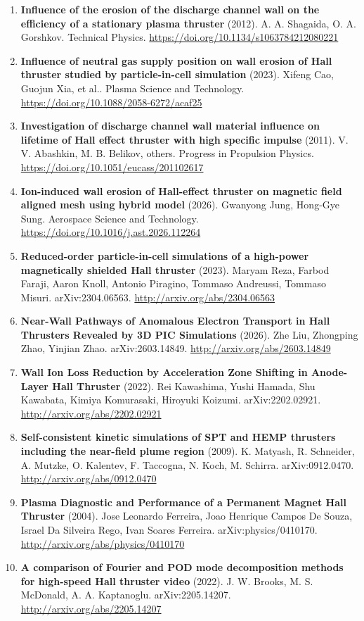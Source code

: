 \documentclass[11pt,a4paper]{article}
\begin{document}
\begin{enumerate}[leftmargin=1.4em]
\item \textbf{Influence of the erosion of the discharge channel wall on the efficiency of a stationary plasma thruster} (2012). A. A. Shagaida, O. A. Gorshkov. Technical Physics. \url{https://doi.org/10.1134/s1063784212080221}
\item \textbf{Influence of neutral gas supply position on wall erosion of Hall thruster studied by particle-in-cell simulation} (2023). Xifeng Cao, Guojun Xia, et al.. Plasma Science and Technology. \url{https://doi.org/10.1088/2058-6272/acaf25}
\item \textbf{Investigation of discharge channel wall material influence on lifetime of Hall effect thruster with high specific impulse} (2011). V. V. Abashkin, M. B. Belikov, others. Progress in Propulsion Physics. \url{https://doi.org/10.1051/eucass/201102617}
\item \textbf{Ion-induced wall erosion of Hall-effect thruster on magnetic field aligned mesh using hybrid model} (2026). Gwanyong Jung, Hong-Gye Sung. Aerospace Science and Technology. \url{https://doi.org/10.1016/j.ast.2026.112264}
\item \textbf{Reduced-order particle-in-cell simulations of a high-power magnetically shielded Hall thruster} (2023). Maryam Reza, Farbod Faraji, Aaron Knoll, Antonio Piragino, Tommaso Andreussi, Tommaso Misuri. arXiv:2304.06563. \url{http://arxiv.org/abs/2304.06563}
\item \textbf{Near-Wall Pathways of Anomalous Electron Transport in Hall Thrusters Revealed by 3D PIC Simulations} (2026). Zhe Liu, Zhongping Zhao, Yinjian Zhao. arXiv:2603.14849. \url{http://arxiv.org/abs/2603.14849}
\item \textbf{Wall Ion Loss Reduction by Acceleration Zone Shifting in Anode-Layer Hall Thruster} (2022). Rei Kawashima, Yushi Hamada, Shu Kawabata, Kimiya Komurasaki, Hiroyuki Koizumi. arXiv:2202.02921. \url{http://arxiv.org/abs/2202.02921}
\item \textbf{Self-consistent kinetic simulations of SPT and HEMP thrusters including the near-field plume region} (2009). K. Matyash, R. Schneider, A. Mutzke, O. Kalentev, F. Taccogna, N. Koch, M. Schirra. arXiv:0912.0470. \url{http://arxiv.org/abs/0912.0470}
\item \textbf{Plasma Diagnostic and Performance of a Permanent Magnet Hall Thruster} (2004). Jose Leonardo Ferreira, Joao Henrique Campos De Souza, Israel Da Silveira Rego, Ivan Soares Ferreira. arXiv:physics/0410170. \url{http://arxiv.org/abs/physics/0410170}
\item \textbf{A comparison of Fourier and POD mode decomposition methods for high-speed Hall thruster video} (2022). J. W. Brooks, M. S. McDonald, A. A. Kaptanoglu. arXiv:2205.14207. \url{http://arxiv.org/abs/2205.14207}

\end{enumerate}
\end{document}
